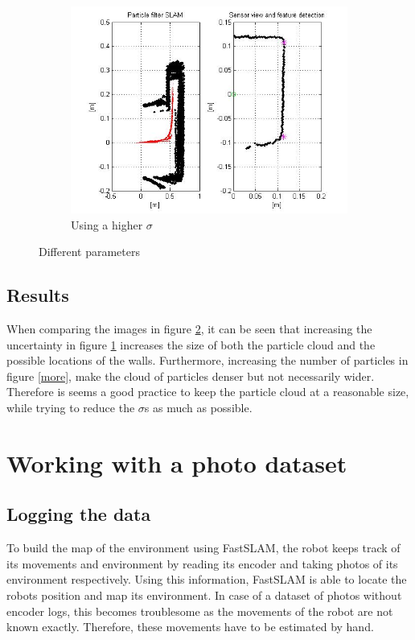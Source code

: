 \documentclass[12pt]{article}
\begin{document}
\begin{figure}[H]
\begin{subfigure}[b]{0.48\textwidth}
	\end{subfigure}
	~
	\begin{subfigure}[b]{0.48\textwidth}
		\includegraphics[width=\textwidth]{sigma_chance.jpg}
		\caption{Using a higher $\sigma$}
		\label{sigma}
	\end{subfigure}
	\caption{Different parameters}
	\label{fig:tweaks}
\end{figure}

\subsection{Results}
When comparing the images in figure \ref{fig:tweaks}, it can be seen that increasing the uncertainty in figure \ref{sigma} increases the size of both the particle cloud and the possible locations of the walls. Furthermore, increasing the number of particles in figure \ref{more}, make the cloud of particles denser but not necessarily wider. Therefore is seems a good practice to keep the particle cloud at a reasonable size, while trying to reduce the $\sigma$s as much as possible. 
\section{Working with a photo dataset}
\subsection{Logging the data}
To build the map of the environment using FastSLAM, the robot keeps track of its movements and environment by reading its encoder and taking photos of its environment respectively. Using this information, FastSLAM is able to locate the robots position and map its environment. In case of a dataset of photos without encoder logs, this becomes troublesome as the movements of the robot are not known exactly. Therefore, these movements have to be estimated by hand.
\end{document}
